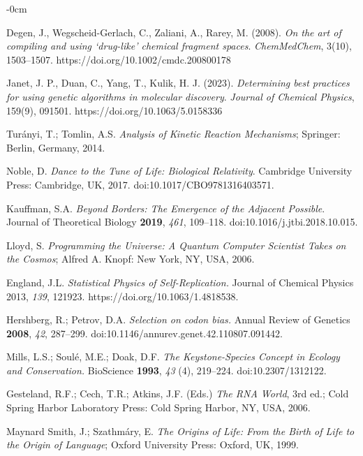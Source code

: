 \documentclass[life,article,submit,pdftex,moreauthors]{Definitions/mdpi}
\begin{document}
\begin{adjustwidth}{-\extralength}{0cm}
{\begin{thebibliography}{999}
Degen, J., Wegscheid-Gerlach, C., Zaliani, A., Rarey, M. (2008).
\textit{On the art of compiling and using ‘drug-like’ chemical fragment spaces}.
\textit{ChemMedChem}, 3(10), 1503–1507. https://doi.org/10.1002/cmdc.200800178

Janet, J. P., Duan, C., Yang, T., Kulik, H. J. (2023).
\textit{Determining best practices for using genetic algorithms in molecular discovery}.
\textit{Journal of Chemical Physics}, 159(9), 091501. https://doi.org/10.1063/5.0158336

Turányi, T.; Tomlin, A.S. \textit{Analysis of Kinetic Reaction Mechanisms}; Springer: Berlin, Germany, 2014.

Noble, D. 
\textit{Dance to the Tune of Life: Biological Relativity}. 
Cambridge University Press: Cambridge, UK, 2017. 
doi:10.1017/CBO9781316403571.

Kauffman, S.A. 
\textit{Beyond Borders: The Emergence of the Adjacent Possible}. 
Journal of Theoretical Biology \textbf{2019}, \textit{461}, 109--118. 
doi:10.1016/j.jtbi.2018.10.015.

Lloyd, S. \textit{Programming the Universe: A Quantum Computer Scientist Takes on the Cosmos}; Alfred A. Knopf: New York, NY, USA, 2006.

England, J.L. 
\textit{Statistical Physics of Self-Replication.} 
Journal of Chemical Physics 2013, \textit{139}, 121923. 
https://doi.org/10.1063/1.4818538.

Hershberg, R.; Petrov, D.A. 
\textit{Selection on codon bias.} 
Annual Review of Genetics \textbf{2008}, \textit{42}, 287--299. 
doi:10.1146/annurev.genet.42.110807.091442.

Mills, L.S.; Soulé, M.E.; Doak, D.F. 
\textit{The Keystone-Species Concept in Ecology and Conservation.} 
BioScience \textbf{1993}, \textit{43} (4), 219--224. 
doi:10.2307/1312122.

Gesteland, R.F.; Cech, T.R.; Atkins, J.F. (Eds.) 
\textit{The RNA World}, 3rd ed.; Cold Spring Harbor Laboratory Press: Cold Spring Harbor, NY, USA, 2006. 

Maynard Smith, J.; Szathmáry, E. 
\textit{The Origins of Life: From the Birth of Life to the Origin of Language}; 
Oxford University Press: Oxford, UK, 1999.


\end{thebibliography}}
\end{adjustwidth}
\end{document}
